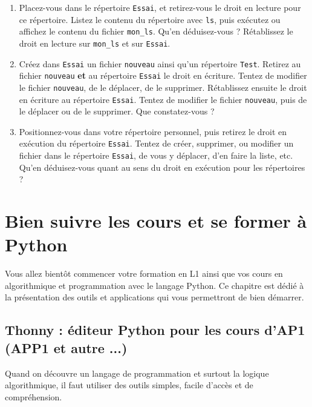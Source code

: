 \documentclass{article}
\begin{document}
\begin{exercice}[Un test.]

\begin{enumerate}
\def\labelenumi{\arabic{enumi}.}
\item
  Placez-vous dans le répertoire \texttt{Essai}, et retirez-vous le
  droit en lecture pour ce répertoire. Listez le contenu du répertoire
  avec \texttt{ls}, puis exécutez ou affichez le contenu du fichier
  \texttt{mon\_ls}. Qu'en déduisez-vous ? Rétablissez le droit en
  lecture sur \texttt{mon\_ls} et sur \texttt{Essai}.
\item
  Créez dans \texttt{Essai} un fichier \texttt{nouveau} ainsi qu'un
  répertoire \texttt{Test}. Retirez au fichier \texttt{nouveau}
  \textbf{et} au répertoire \texttt{Essai} le droit en écriture. Tentez
  de modifier le fichier \texttt{nouveau}, de le déplacer, de le
  supprimer. Rétablissez ensuite le droit en écriture au répertoire
  \texttt{Essai}. Tentez de modifier le fichier \texttt{nouveau}, puis
  de le déplacer ou de le supprimer. Que constatez-vous ?
\item
  Positionnez-vous dans votre répertoire personnel, puis retirez le
  droit en exécution du répertoire \texttt{Essai}. Tentez de créer,
  supprimer, ou modifier un fichier dans le répertoire \texttt{Essai},
  de vous y déplacer, d'en faire la liste, etc. Qu'en déduisez-vous
  quant au sens du droit en exécution pour les répertoires ?
\end{enumerate}

\end{exercice}

\section {Bien suivre les cours et se former à Python}

Vous allez bientôt commencer votre formation en L1 ainsi que vos cours en algorithmique et programmation avec le langage Python. Ce chapitre est dédié à la présentation des outils et applications qui vous permettront de bien démarrer.

\subsection{Thonny : éditeur Python pour les cours d'AP1 (APP1 et autre ...)}

Quand on découvre un langage de programmation et surtout la logique algorithmique, il faut utiliser des outils simples, facile d'accès et de compréhension.
\end{document}
